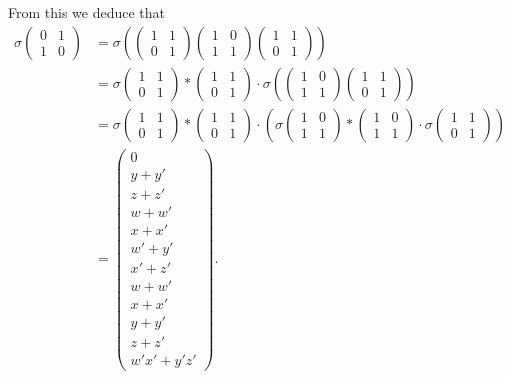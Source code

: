 From this we deduce that
\begin{align*}
\sigma\left(\begin{matrix} 0 & 1 \\ 1 & 0 \end{matrix}\right) &=
\sigma\left(
\left(\begin{matrix} 1 & 1 \\ 0 & 1 \end{matrix}\right)
\left(\begin{matrix} 1 & 0 \\ 1 & 1 \end{matrix}\right)
\left(\begin{matrix} 1 & 1 \\ 0 & 1 \end{matrix}\right)
\right) \\
&=
\sigma
\left(\begin{matrix} 1 & 1 \\ 0 & 1 \end{matrix}\right)
*
\left(\begin{matrix} 1 & 1 \\ 0 & 1 \end{matrix}\right)
\cdot
\sigma\left(
\left(\begin{matrix} 1 & 0 \\ 1 & 1 \end{matrix}\right)
\left(\begin{matrix} 1 & 1 \\ 0 & 1 \end{matrix}\right)
\right) \\
&=
\sigma
\left(\begin{matrix} 1 & 1 \\ 0 & 1 \end{matrix}\right)
*
\left(\begin{matrix} 1 & 1 \\ 0 & 1 \end{matrix}\right)
\cdot
\left(
\sigma\left(\begin{matrix} 1 & 0 \\ 1 & 1 \end{matrix}\right)
*
\left(\begin{matrix} 1 & 0 \\ 1 & 1 \end{matrix}\right)
\cdot
\sigma\left(\begin{matrix} 1 & 1 \\ 0 & 1 \end{matrix}\right)
\right) \\
&=
\left(\begin{matrix}
0 \\
y + y' \\
z + z' \\
w + w' \\
x + x' \\
w' + y' \\
x' + z' \\
w + w' \\
x + x' \\
y + y' \\
z + z' \\
w'x' + y'z'
\end{matrix}\right).
\end{align*}

